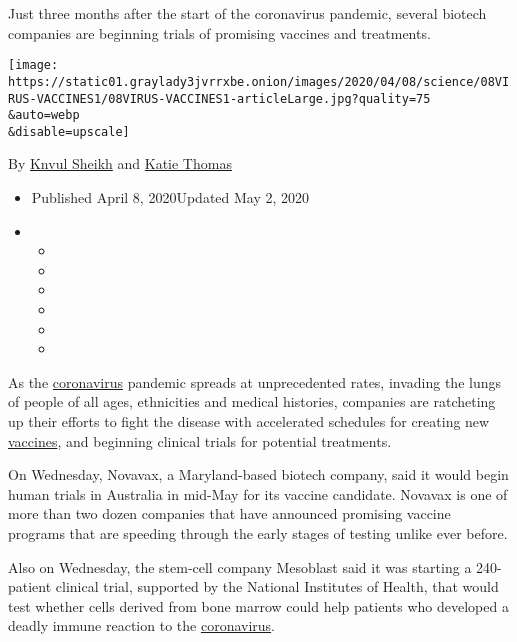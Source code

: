 Just three months after the start of the coronavirus pandemic, several
biotech companies are beginning trials of promising vaccines and
treatments.

\texttt{[image: https://static01.graylady3jvrrxbe.onion/images/2020/04/08/science/08VIRUS-VACCINES1/08VIRUS-VACCINES1-articleLarge.jpg?quality=75\\\&auto=webp\\\&disable=upscale]}

By \href{https://www.nytimes3xbfgragh.onion/by/knvul-sheikh}{Knvul
Sheikh} and
\href{https://www.nytimes3xbfgragh.onion/by/katie-thomas}{Katie Thomas}

\begin{itemize}
\item
  Published April 8, 2020Updated May 2, 2020
\item
  \begin{itemize}
  \item
  \item
  \item
  \item
  \item
  \item
  \end{itemize}
\end{itemize}

As the
\href{https://www.nytimes3xbfgragh.onion/2020/04/27/world/europe/coronavirus-vaccine-update-oxford.html}{coronavirus}
pandemic spreads at unprecedented rates, invading the lungs of people of
all ages, ethnicities and medical histories, companies are ratcheting up
their efforts to fight the disease with accelerated schedules for
creating new
\href{https://www.nytimes3xbfgragh.onion/2020/04/27/world/europe/coronavirus-vaccine-update-oxford.html}{vaccines},
and beginning clinical trials for potential treatments.

On Wednesday, Novavax, a Maryland-based biotech company, said it would
begin human trials in Australia in mid-May for its vaccine candidate.
Novavax is one of more than two dozen companies that have announced
promising vaccine programs that are speeding through the early stages of
testing unlike ever before.

Also on Wednesday, the stem-cell company Mesoblast said it was starting
a 240-patient clinical trial, supported by the National Institutes of
Health, that would test whether cells derived from bone marrow could
help patients who developed a deadly immune reaction to the
\href{https://www.nytimes3xbfgragh.onion/2020/04/10/health/coronavirus-antibody-test.html}{coronavirus}.

